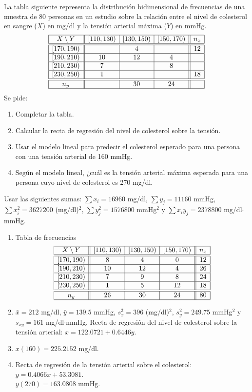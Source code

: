 {La tabla siguiente representa la distribución bidimensional de frecuencias de una muestra de 80 personas en un estudio sobre la relación entre el nivel de colesterol en sangre ($X$) en mg/dl y la tensión arterial máxima ($Y$) en mmHg.
\[
\begin{array}{|c||c|c|c||c|}
\hline
X\setminus Y & [110,130) & [130,150) & [150,170) & n_x \\
\hline\hline
[170,190)   &           &     4     &           & 12\\
\hline
[190,210)   &    10     &    12     &     4     &   \\
\hline
[210,230)   &     7     &           &     8     &   \\
\hline
[230,250)   &     1     &           &           & 18\\
\hline\hline
n_y          &           &    30     &    24    &    \\
\hline
\end{array}
\]
Se pide:
\begin{enumerate}
\item Completar la tabla.
\item Calcular la recta de regresión del nivel de colesterol sobre la tensión.
\item Usar el modelo lineal para predecir el colesterol esperado para una persona con una tensión arterial de 160 mmHg.
\item Según el modelo lineal, ¿cuál es la tensión arterial máxima esperada para una persona cuyo nivel de colesterol es 270 mg/dl.
\end{enumerate}

Usar las siguientes sumas:
$\sum x_i=16960$ mg/dl, $\sum y_j=11160$ mmHg, $\sum x_i^2=3627200$ (mg/dl)$^2$, $\sum y_j^2=1576800$ mmHg$^2$ y
$\sum x_iy_j=2378800$ mg/dl$\cdot$mmHg.
}
{
\begin{enumerate}
\item Tabla de frecuencias
\[
\begin{array}{|c||c|c|c||c|}
\hline
X\setminus Y & [110,130) & [130,150) & [150,170) & n_x \\
\hline\hline
[170,190)   &     8     &     4     &     0     & 12 \\
\hline
[190,210)   &    10     &    12     &     4     & 26 \\
\hline
[210,230)   &     7     &     9     &     8     & 24 \\
\hline
[230,250)   &     1     &     5     &    12     & 18 \\
\hline\hline
n_y          &   26     &    30     &    24     & 80 \\
\hline
\end{array}
\]
\item $\bar x=212$ mg/dl, $\bar y=139.5$ mmHg, $s_x^2=396$ (mg/dl)$^2$, $s_y^2=249.75$ mmHg$^2$ y $s_{xy}=161$
mg/dl$\cdot$mmHg. Recta de regresión del nivel de colesterol sobre la tensión arterial: $x=122.0721+0.6446y$. 
\item  $x(160)=225.2152$ mg/dl.
\item Recta de regresión de la tensión arterial sobre el colesterol: $y=0.4066x+53.3081$.\\
$y(270)=163.0808$ mmHg.
\end{enumerate}
}
